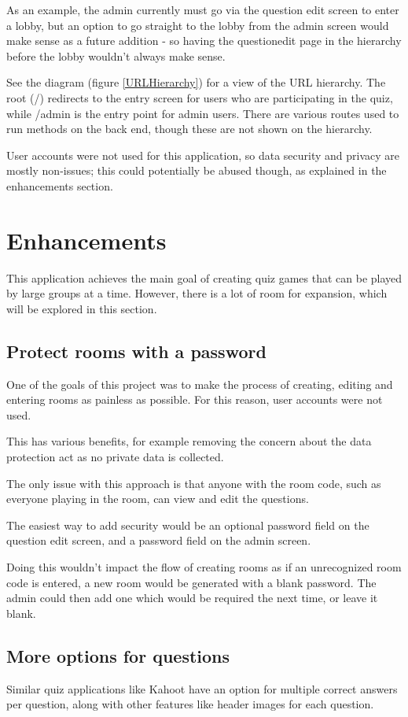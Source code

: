 \documentclass[10pt, a4paper]{article}
\begin{document}
	As an example, the admin currently must go via the question edit screen to enter a lobby, but an option to go straight to the lobby from the admin screen would make sense as a future addition - so having the questionedit page in the hierarchy before the lobby wouldn't always make sense.
	
	See the diagram (figure \ref{URLHierarchy}) for a view of the URL hierarchy. The root (/) redirects to the entry screen for users who are participating in the quiz, while /admin is the entry point for admin users. There are various routes used to run methods on the back end, though these are not shown on the hierarchy.
	
	User accounts were not used for this application, so data security and privacy are mostly non-issues; this could potentially be abused though, as explained in the enhancements section.
	
	\section{Enhancements}
	This application achieves the main goal of creating quiz games that can be played by large groups at a time. However, there is a lot of room for expansion, which will be explored in this section.
	
	\subsection{Protect rooms with a password}
	One of the goals of this project was to make the process of creating, editing and entering rooms as painless as possible. For this reason, user accounts were not used.
	
	This has various benefits, for example removing the concern about the data protection act as no private data is collected.
	
	The only issue with this approach is that anyone with the room code, such as everyone playing in the room, can view and edit the questions.
	
	The easiest way to add security would be an optional password field on the question edit screen, and a password field on the admin screen. 
	
	Doing this wouldn't impact the flow of creating rooms as if an unrecognized room code is entered, a new room would be generated with a blank password. The admin could then add one which would be required the next time, or leave it blank.
	
	\subsection{More options for questions}
	Similar quiz applications like Kahoot have an option for multiple correct answers per question, along with other features like header images for each question.
	
\end{document}
